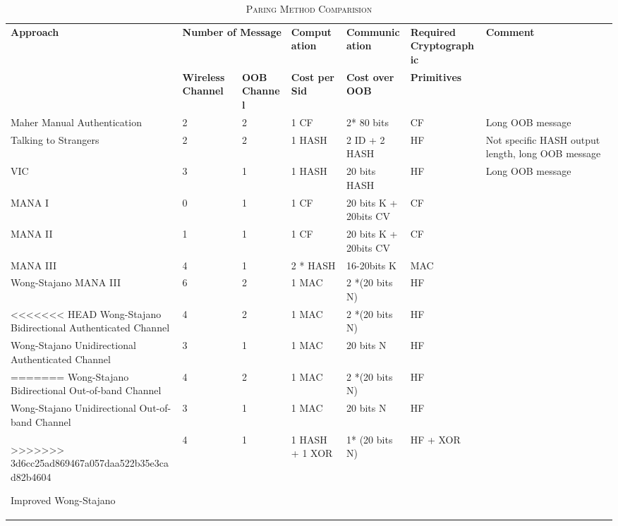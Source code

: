 \begin{table}[ht] 
\centering
\caption{\textsc{Paring Method Comparision}}
\label{paircom}
{\scriptsize
\begin{tabular}{ | p{2cm} | p{1.4cm} | p{1.4cm} | p{2cm} | p{2.2cm} | p{2cm} | p{2cm}| }
\hline
\textbf{Approach} &\multicolumn{2}{c}{ \textbf{Number of Message}} & \textbf{Computation} & \textbf{Communication} & \textbf{Required Cryptographic} & \textbf{Comment}\\ 
 & \textbf{Wireless Channel} & \textbf{OOB Channel} & \textbf{Cost per Sid} & \textbf{Cost over OOB} & \textbf{Primitives} & \\ \hline \hline

Maher Manual Authentication & 2 & 2 & 1 CF & 2* 80 bits & CF & Long OOB message \\ \hline

Talking to Strangers & 2 &	 2	& 1 HASH &	 2 ID + 2 HASH	& HF	& Not specific HASH output length, long OOB message \\ \hline 

VIC & 3	& 1	& 1 HASH 	 & 20 bits HASH	& HF & Long OOB message \\ \hline 

MANA I	& 0	& 1	& 1 CF & 20 bits K + 20bits CV	& CF & \\ \hline 

MANA II	& 1	& 1 & 1 CF & 20 bits K + 20bits CV	& CF & \\ \hline 

MANA III	& 4	& 1 & 2 * HASH	& 16-20bits K & MAC & \\ \hline 

Wong-Stajano MANA III & 6 & 2	& 1 MAC	& 2 *(20 bits N) & HF & \\ \hline 

<<<<<<< HEAD
Wong-Stajano Bidirectional Authenticated Channel & 4	 & 2	& 1 MAC & 2 *(20 bits N) 	 & HF	 & \\ \hline 

Wong-Stajano Unidirectional Authenticated Channel & 3 &	 1	& 1 MAC	 & 20 bits N &	 HF & \\ \hline 
=======
Wong-Stajano Bidirectional Out-of-band Channel & 4	 & 2	& 1 MAC & 2 *(20 bits N) 	 & HF	 & \\ \hline 

Wong-Stajano Unidirectional Out-of-band Channel & 3 &	 1	& 1 MAC	 & 20 bits N &	 HF & \\ \hline 
>>>>>>> 3d6cc25ad869467a057daa522b35e3cad82b4604

Improved Wong-Stajano & 4	& 1	& 1 HASH + 1 XOR	 & 1* (20 bits N) &	 HF + XOR & \\ \hline 


\end{tabular}}
\end{table}
